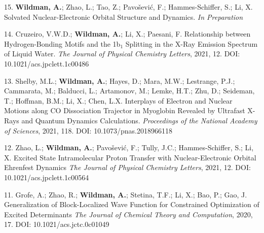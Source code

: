 


\begin{cvpublications}


\cvpublication
{15.} 
{\textbf{Wildman, A.}; Zhao, L.; Tao, Z.; Pavo\v{s}evi\'{c}, F.; Hammes-Schiffer, S.; Li, X. Solvated Nuclear-Electronic Orbital Structure and Dynamics. \textit{In Preparation}}


\cvpublication
{14.} 
{Cruzeiro, V.W.D.; \textbf{Wildman, A.}; Li, X.; Paesani, F. Relationship between Hydrogen-Bonding Motifs and the 1b$_1$ Splitting in the X-Ray Emission Spectrum of Liquid Water. \textit{The Journal of Physical Chemistry Letters}, 2021, 12. DOI: 10.1021/acs.jpclett.1c00486}


\cvpublication
{13.} 
{Shelby, M.L.; \textbf{Wildman, A.}; Hayes, D.; Mara, M.W.; Lestrange, P.J.; Cammarata, M.; Balducci, L.; Artamonov, M.; Lemke, H.T.; Zhu, D.; Seideman, T.; Hoffman, B.M.; Li, X.; Chen, L.X. Interplays of Electron and Nuclear Motions along CO Dissociation Trajector in Myoglobin Revealed by Ultrafast X-Rays and Quantum Dynamics Calculations. \textit{Proceedings of the National Academy of Sciences}, 2021, 118. DOI: 10.1073/pnas.2018966118}



\cvpublication
{12.} 
{Zhao, L.; \textbf{Wildman, A.}; Pavo\v{s}evi\'{c}, F.; Tully, J.C.; Hammes-Schiffer, S.; Li, X. Excited State Intramolecular Proton Transfer with Nuclear-Electronic Orbital Ehrenfest Dynamics \textit{The Journal of Physical Chemistry Letters}, 2021, 12. DOI: 10.1021/acs.jpclett.1c00564}



\cvpublication
{11.} 
{Grofe, A.; Zhao, R.; \textbf{Wildman, A.}; Stetina, T.F.; Li, X.; Bao, P.; Gao, J. Generalization of Block-Localized Wave Function for Constrained Optimization of Excited Determinants \textit{The Journal of Chemical Theory and Computation}, 2020, 17. DOI: 10.1021/acs.jctc.0c01049}



\end{cvpublications}
